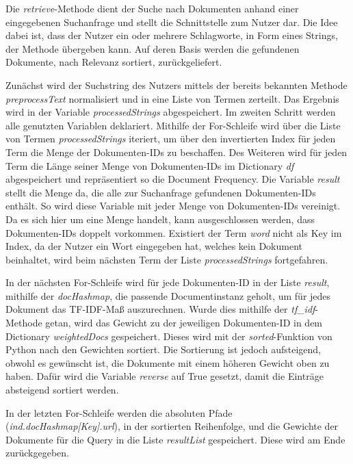 Die \textit{retrieve}-Methode dient der Suche nach Dokumenten anhand einer eingegebenen Suchanfrage und stellt die Schnittstelle zum Nutzer dar. Die Idee dabei ist, dass der Nutzer ein oder mehrere Schlagworte, in Form eines Strings, der Methode übergeben kann. Auf deren Basis werden die gefundenen Dokumente, nach Relevanz sortiert, zurückgeliefert. 

Zunächst wird der Suchstring des Nutzers mittels der bereits bekannten Methode \textit{preprocessText} normalisiert und in eine Liste von Termen zerteilt. Das Ergebnis wird in der Variable \textit{processedStrings} abgespeichert. Im zweiten Schritt werden alle genutzten Variablen deklariert. Mithilfe der For-Schleife wird über die Liste von Termen \textit{processedStrings} iteriert, um über den invertierten Index für jeden Term die Menge der Dokumenten-IDs zu beschaffen. Des Weiteren wird für jeden Term die Länge seiner Menge von Dokumenten-IDs im Dictionary \textit{df} abgespeichert und repräsentiert so die Document Frequency. Die Variable \textit{result} stellt die Menge da, die alle zur Suchanfrage gefundenen Dokumenten-IDs enthält. So wird diese Variable mit jeder Menge von Dokumenten-IDs vereinigt. Da es sich hier um eine Menge handelt, kann ausgeschlossen werden, dass Dokumenten-IDs doppelt vorkommen. Existiert der Term \textit{word} nicht als Key im Index, da der Nutzer ein Wort eingegeben hat, welches kein Dokument beinhaltet, wird beim nächsten Term der Liste \emph{processedStrings} fortgefahren.

In der nächsten For-Schleife wird für jede Dokumenten-ID in der Liste \textit{result}, mithilfe der \textit{docHashmap}, die passende Documentinstanz geholt, um für jedes Dokument das TF-IDF-Maß auszurechnen. Wurde dies mithilfe der \textit{tf\_idf}-Methode getan, wird das Gewicht zu der jeweiligen Dokumenten-ID in dem Dictionary \textit{weightedDocs} gespeichert. Dieses wird mit der \textit{sorted}-Funktion von Python nach den Gewichten sortiert. Die Sortierung ist jedoch aufsteigend, obwohl es gewünscht  ist, die Dokumente mit einem höheren Gewicht oben zu haben. Dafür wird die Variable \textit{reverse} auf True gesetzt, damit die Einträge absteigend sortiert werden.

In der letzten For-Schleife werden die absoluten Pfade (\textit{ind.docHashmap[Key].url}), in der sortierten Reihenfolge, und die Gewichte der Dokumente für die Query in die Liste \textit{resultList} gespeichert. Diese wird am Ende zurückgegeben.

